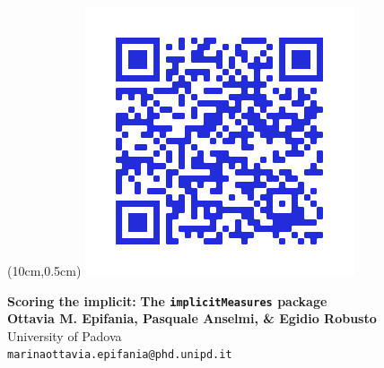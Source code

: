 \documentclass[a0,landscape]{a0poster}
\begin{document}


\begin{minipage}[b]{\linewidth}
	\begin{textblock*}{12cm}(10cm,0.5cm)
		\includegraphics[width=\linewidth]{implicitMeasures.png}\\
	\end{textblock*}
	
	\begin{center}
\veryHuge \textcolor{title}{\textbf{Scoring the implicit:}}
\veryHuge\textcolor{title}{\textbf{The \texttt{implicitMeasures} package}}\\[2cm] %

\LARGE \textbf{Ottavia M. Epifania, Pasquale Anselmi, \& Egidio Robusto}\\[0.5cm] %
\Large University of Padova\\[0.4cm] %
\Large \texttt{marinaottavia.epifania@phd.unipd.it}\\	
	\end{center}


\end{minipage}
\end{document}
